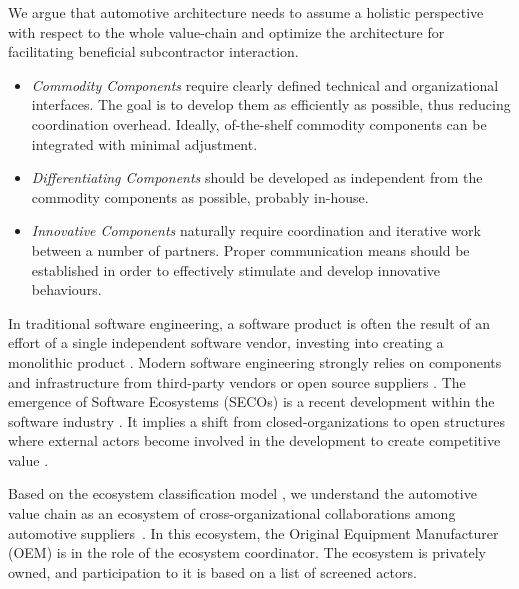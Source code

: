 We argue that automotive architecture needs to assume a holistic perspective with respect to the whole value-chain and optimize the architecture for facilitating beneficial subcontractor interaction. %
\begin{itemize}
\item \textit{Commodity Components} require clearly defined technical and organizational interfaces. 
The goal is to develop them as efficiently as possible, thus reducing coordination overhead. 
Ideally, of-the-shelf commodity components can be integrated with minimal adjustment. 
\item \textit{Differentiating Components} should be developed as independent from the commodity components as possible, probably in-house. 
\item \textit{Innovative Components} naturally require coordination and iterative work between a number of partners. Proper communication means should be established in order to effectively stimulate and develop  innovative behaviours.  
\end{itemize}


In traditional software engineering, a software product is often the result of an effort of a single independent software vendor, investing into creating a monolithic product \cite{jansen2013defining, wnuk2014evaluating}.
Modern software engineering strongly relies on components and infrastructure from third-party vendors or open source suppliers \cite{jansen2013defining, wnuk2014evaluating}.
The emergence of Software Ecosystems (SECOs) is a recent development within the software industry \cite{hanssen2012longitudinal, wnuk2014evaluating}.
It implies a shift from closed-organizations to open structures where external actors become involved in the development to create competitive value \cite{jansen2013defining, hanssen2012longitudinal}.

Based on the ecosystem classification model \cite{jansen2013defining}, we  understand the automotive value chain as an ecosystem of cross-organizational collaborations among automotive suppliers~\cite{knauss2014towards}. 
In this ecosystem, the Original Equipment Manufacturer (OEM) is in the role of the ecosystem coordinator.
The ecosystem is privately owned, and participation to it is based on a list of screened actors. 

